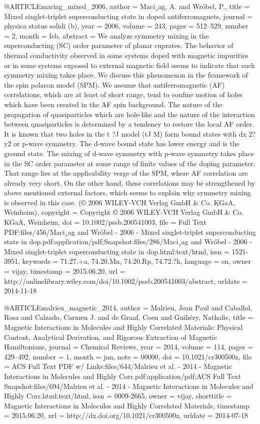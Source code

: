@ARTICLE{maciag_mixed_2006,
  author = {Maci¸ag, A. and Wróbel, P.},
  title = {Mixed singlet-triplet superconducting state in doped antiferromagnets},
  journal = {physica status solidi (b)},
  year = {2006},
  volume = {243},
  pages = {512--529},
  number = {2},
  month = feb,
  abstract = {We analyze symmetry mixing in the superconducting (SC) order parameter
	of planar cuprates. The behavior of thermal conductivity observed
	in some systems doped with magnetic impurities or in some systems
	exposed to external magnetic field seems to indicate that such symmetry
	mixing takes place. We discuss this phenomenon in the framework of
	the spin polaron model (SPM). We assume that antiferromagnetic (AF)
	correlations, which are at least of short range, tend to confine
	motion of holes which have been created in the AF spin background.
	The nature of the propagation of quasiparticles which are hole-like
	and the nature of the interaction between quasiparticles is determined
	by a tendency to restore the local AF order. It is known that two
	holes in the t ?J model (tJ M) form bound states with dx 2?y2 or
	p-wave symmetry. The d-wave bound state has lower energy and is the
	ground state. The mixing of d-wave symmetry with p-wave symmetry
	takes place in the SC order parameter at some range of finite values
	of the doping parameter. That range lies at the applicability verge
	of the SPM, where AF correlation are already very short. On the other
	hand, these correlations may be strengthened by above mentioned external
	factors, which seems to explain why symmetry mixing is observed in
	this case. (© 2006 WILEY-VCH Verlag GmbH \& Co. KGaA, Weinheim)},
  copyright = {Copyright © 2006 WILEY-VCH Verlag GmbH \& Co. KGaA, Weinheim},
  doi = {10.1002/pssb.200541003},
  file = {Full Text PDF:files/456/Maci¸ag and Wróbel - 2006 - Mixed singlet-triplet superconducting state in dop.pdf:application/pdf;Snapshot:files/286/Maci¸ag and Wróbel - 2006 - Mixed singlet-triplet superconducting state in dop.html:text/html},
  issn = {1521-3951},
  keywords = {71.27.+a, 74.20.Mn, 74.20.Rp, 74.72.?h},
  language = {en},
  owner = {vijay},
  timestamp = {2015.06.20},
  url = {http://onlinelibrary.wiley.com/doi/10.1002/pssb.200541003/abstract},
  urldate = {2014-11-18}
}

@ARTICLE{malrieu_magnetic_2014,
  author = {Malrieu, Jean Paul and Caballol, Rosa and Calzado, Carmen J. and
	de Graaf, Coen and Guihéry, Nathalie},
  title = {Magnetic {Interactions} in {Molecules} and {Highly} {Correlated}
	{Materials}: {Physical} {Content}, {Analytical} {Derivation}, and
	{Rigorous} {Extraction} of {Magnetic} {Hamiltonians}},
  journal = {Chemical Reviews},
  year = {2014},
  volume = {114},
  pages = {429--492},
  number = {1},
  month = jan,
  note = {00000},
  doi = {10.1021/cr300500z},
  file = {ACS Full Text PDF w/ Links:files/644/Malrieu et al. - 2014 - Magnetic Interactions in Molecules and Highly Corr.pdf:application/pdf;ACS Full Text Snapshot:files/694/Malrieu et al. - 2014 - Magnetic Interactions in Molecules and Highly Corr.html:text/html},
  issn = {0009-2665},
  owner = {vijay},
  shorttitle = {Magnetic {Interactions} in {Molecules} and {Highly} {Correlated} {Materials}},
  timestamp = {2015.06.20},
  url = {http://dx.doi.org/10.1021/cr300500z},
  urldate = {2014-07-18}
}

